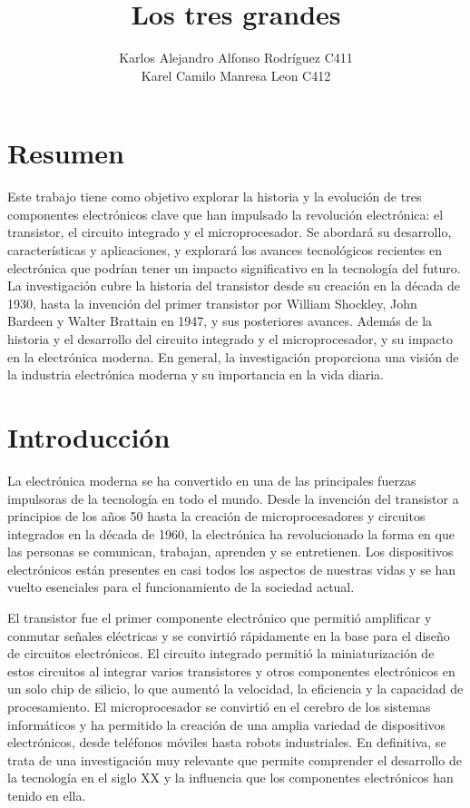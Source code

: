 \documentclass{article}
\begin{document}
\title{Los tres grandes}
\author{Karlos Alejandro Alfonso Rodríguez C411\\Karel Camilo Manresa Leon C412}
\maketitle
\newpage

\section*{Resumen}
Este trabajo tiene como objetivo explorar la historia y la evolución de tres componentes electrónicos clave 
que han impulsado la revolución electrónica: el transistor, el circuito integrado y el microprocesador. 
Se abordará su desarrollo, características y aplicaciones, y explorará los avances tecnológicos 
recientes en electrónica que podrían tener un impacto significativo en la tecnología del futuro. 
La investigación cubre la historia del transistor desde su creación en la década de 1930, 
hasta la invención del primer transistor por William Shockley, John Bardeen y Walter Brattain en 1947, 
y sus posteriores avances. Además de la historia y el desarrollo del circuito integrado y el microprocesador, 
y su impacto en la electrónica moderna. En general, la investigación proporciona una visión de la industria 
electrónica moderna y su importancia en la vida diaria.

\newpage

\section*{Introducción}

La electrónica moderna se ha convertido en una de las principales fuerzas impulsoras de la tecnología
en todo el mundo. Desde la invención del transistor a principios de los años
50 hasta la creación de microprocesadores y circuitos integrados en la década de 1960, 
la electrónica ha revolucionado la forma en que las personas se comunican, trabajan, aprenden 
y se entretienen. Los dispositivos electrónicos están presentes en casi todos los aspectos de nuestras 
vidas y se han vuelto esenciales para el funcionamiento de la sociedad actual.

El transistor fue el primer componente electrónico que permitió amplificar y conmutar señales eléctricas
y se convirtió rápidamente en la base para el diseño de circuitos electrónicos. El circuito integrado 
permitió la miniaturización de estos circuitos al integrar varios transistores y otros componentes electrónicos
en un solo chip de silicio, lo que aumentó la velocidad, la eficiencia y la capacidad 
de procesamiento. El microprocesador se convirtió en el cerebro de los sistemas informáticos y ha permitido
la creación de una amplia variedad de dispositivos electrónicos, desde teléfonos móviles hasta 
robots industriales. En definitiva, se trata de una investigación muy relevante que permite comprender 
el desarrollo de la tecnología en el siglo XX y la influencia que los componentes electrónicos han 
tenido en ella.
\end{document}
